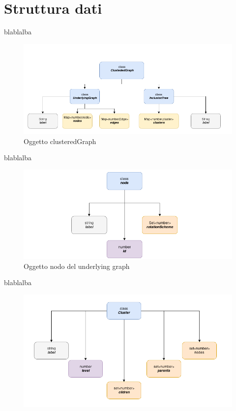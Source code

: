 \large{

\section{Struttura dati}
blablalba
\begin{figure}[!htb]
	\begin{center}
		\includegraphics[width=1 \linewidth]{figure/cgraphClass}
	\end{center}
	\caption{Oggetto clusteredGraph\label{fig:cgraphClass}}
\end{figure}
blablalba
\begin{figure}[!htb]
	\begin{center}
		\includegraphics[width=1 \linewidth]{figure/nodeClass}
	\end{center}
	\caption{Oggetto nodo del underlying graph\label{fig:nodeClass}}
\end{figure}
blablalba
\begin{figure}[!htb]
	\begin{center}
		\includegraphics[width=1 \linewidth]{figure/clusterClass}

\end{center}
\end{figure}}
